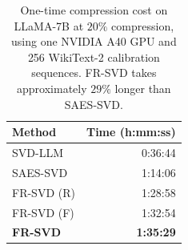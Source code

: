 \begin{table}[tbp]
\centering
\small
\setlength{\tabcolsep}{8pt}
\renewcommand{\arraystretch}{1.10}
\begin{tabular}{@{}lr@{}}
\toprule
Method & Time (h:mm:ss) \\
\midrule
SVD-LLM & 0:36:44 \\
SAES-SVD & 1:14:06 \\
FR-SVD (R) & 1:28:58 \\
FR-SVD (F) & 1:32:54 \\
\textbf{FR-SVD} & \textbf{1:35:29} \\
\bottomrule
\end{tabular}
\caption{One-time compression cost on LLaMA-7B at $20\%$ compression,
using one NVIDIA A40 GPU and 256 WikiText-2 calibration sequences.
FR-SVD takes approximately $29\%$ longer than SAES-SVD.}
\label{tab:compression-time}
\end{table}
